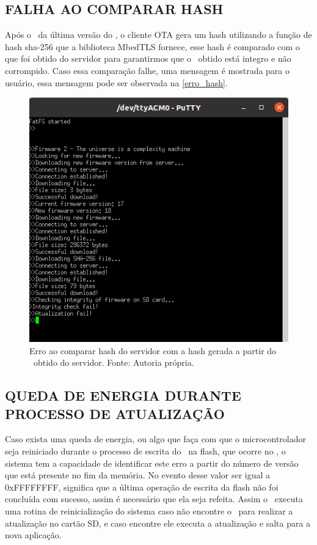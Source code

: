 \subsection{FALHA AO COMPARAR HASH}
Após o \download\ da última versão do \firmware, o cliente OTA gera um hash utilizando a função de hash sha-256 que a biblioteca MbedTLS fornece, esse hash é comparado com o que foi obtido do servidor para garantirmos que o \firmware\ obtido está integro e não corrompido. Caso essa comparação falhe, uma mensagem é mostrada para o usuário, essa mensagem pode ser observada na \autoref{erro_hash}.
\begin{figure}[H]
    \scriptsize
     \centering
     \includegraphics[scale=1.2]{dados/figuras/hash_error.png}
     \caption{Erro ao comparar hash do servidor com a hash gerada a partir do \firmware\ obtido do servidor. \newline Fonte: Autoria própria.}
     \label{erro_hash}
\end{figure}
\subsection{QUEDA DE ENERGIA DURANTE PROCESSO DE ATUALIZAÇÃO}
Caso exista uma queda de energia, ou algo que faça com que o microcontrolador seja reiniciado durante o processo de escrita do \firmware\ na flash, que ocorre no \bootloader, o sistema tem a capacidade de identificar este erro a partir do número de versão que está presente no fim da memória. No evento desse valor ser igual a 0xFFFFFFFF, significa que a última operação de escrita da flash não foi concluída com sucesso, assim é necessário que ela seja refeita. Assim o \bootloader\ executa uma rotina de reinicialização do sistema caso não encontre o \firmware\ para realizar a atualização no cartão SD, e caso encontre ele executa a atualização e salta para a nova aplicação.


